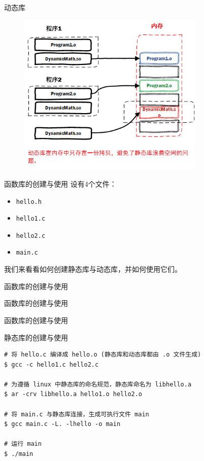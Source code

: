\begin{frame}{动态库}
  \begin{figure}
    \centering
    \includegraphics[width=3.5in]{slide01/images/dll.png}
  \end{figure}
\end{frame}

\begin{frame}{函数库的创建与使用}
  设有4个文件：
  \begin{itemize}
  \item \lstinline|hello.h|
  \item \lstinline|hello1.c|
  \item \lstinline|hello2.c|
  \item \lstinline|main.c|
  \end{itemize}
  我们来看看如何创建静态库与动态库，并如何使用它们。
\end{frame}

\begin{frame}{函数库的创建与使用}
  
\end{frame}

\begin{frame}{函数库的创建与使用}
  

  
\end{frame}

\begin{frame}{函数库的创建与使用}
  
\end{frame}

\begin{frame}[fragile]{静态库的创建与使用}

  \begin{lstlisting}
# 将 hello.c 编译成 hello.o (静态库和动态库都由 .o 文件生成)
$ gcc -c hello1.c hello2.c

# 为遵循 linux 中静态库的命名规范，静态库命名为 libhello.a
$ ar -crv libhello.a hello1.o hello2.o

# 将 main.c 与静态库连接，生成可执行文件 main
$ gcc main.c -L. -lhello -o main

# 运行 main
$ ./main
  \end{lstlisting}
  
\end{frame}



